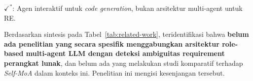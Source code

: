 \begin{table}[htbp]
	\centering
	\caption{Perbandingan Penelitian Terkait}
	\label{tab:related-work}
	\renewcommand{\arraystretch}{1.25}
	\vspace{2mm}

	\small{$\checkmark^*$: Agen interaktif untuk \textit{code generation}, bukan arsitektur multi-agent untuk RE.}
\end{table}

Berdasarkan sintesis pada Tabel~\ref{tab:related-work}, teridentifikasi bahwa \textbf{belum ada penelitian yang secara spesifik menggabungkan arsitektur role-based multi-agent LLM dengan deteksi ambiguitas requirement perangkat lunak}, dan belum ada yang melakukan studi komparatif terhadap \textit{Self-MoA} dalam konteks ini. Penelitian ini mengisi kesenjangan tersebut.
